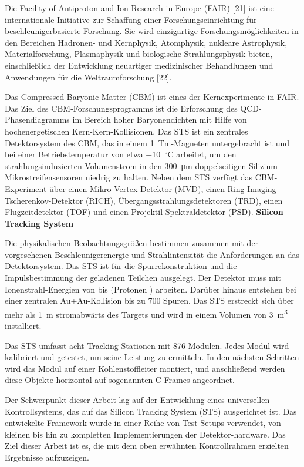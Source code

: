 Die Facility of Antiproton and Ion Research in Europe (FAIR) [21] ist eine internationale Initiative zur Schaffung einer Forschungseinrichtung für beschleunigerbasierte Forschung. Sie wird einzigartige Forschungsmöglichkeiten in den Bereichen Hadronen- und Kernphysik, Atomphysik, nukleare Astrophysik, Materialforschung, Plasmaphysik und biologische Strahlungsphysik bieten, einschließlich der Entwicklung neuartiger medizinischer Behandlungen und Anwendungen für die Weltraumforschung [22].

Das Compressed Baryonic Matter (CBM) ist eines der Kernexperimente in FAIR. Das Ziel des CBM-Forschungsprogramms ist die Erforschung des QCD-Phasendiagramms im Bereich hoher Baryonendichten mit Hilfe von hochenergetischen Kern-Kern-Kollisionen. Das \gls{STS} ist ein zentrales Detektorsystem des CBM, das in einem 1~Tm-Magneten untergebracht ist und bei einer Betriebstemperatur von etwa \SI{-10}{\celsius} arbeitet, um den strahlungsinduzierten Volumenstrom in den \SI{300}{\micro\metre} doppelseitigen Silizium-Mikrostreifensensoren niedrig zu halten. Neben dem \gls{STS} verfügt das CBM-Experiment über einen Mikro-Vertex-Detektor (MVD), einen Ring-Imaging-Tscherenkov-Detektor (RICH), Übergangsstrahlungsdetektoren (TRD), einen Flugzeitdetektor (TOF) und einen Projektil-Spektraldetektor (PSD).
\bigbreak
\textbf{Silicon Tracking System}
\bigbreak

Die physikalischen Beobachtungsgrößen bestimmen zusammen mit der vorgesehenen Beschleunigerenergie und Strahlintensität die Anforderungen an das Detektorsystem. Das \gls{STS} ist für die Spurrekonstruktion und die Impulsbestimmung der geladenen Teilchen ausgelegt. Der Detektor muss mit Ionenstrahl-Energien von  bis  (Protonen ) arbeiten. Darüber hinaus entstehen bei einer zentralen Au+Au-Kollision bis zu 700 Spuren. Das \gls{STS} erstreckt sich über mehr als \SI{1}{\meter} stromabwärts des Targets und wird in einem Volumen von \SI{3}{\cubic\meter} installiert. 

Das \gls{STS} umfasst acht Tracking-Stationen mit 876 Modulen. Jedes Modul wird kalibriert und getestet, um seine Leistung zu ermitteln. In den nächsten Schritten wird das Modul auf einer Kohlenstoffleiter montiert, und anschließend werden diese Objekte horizontal auf sogenannten C-Frames angeordnet. 

Der Schwerpunkt dieser Arbeit lag auf der Entwicklung eines universellen Kontrollsystems, das auf das Silicon Tracking System (\gls{STS}) ausgerichtet ist. Das entwickelte Framework wurde in einer Reihe von Test-Setups verwendet, von kleinen bis hin zu kompletten Implementierungen der Detektor-hardware. Das Ziel dieser Arbeit ist es, die mit dem oben erwähnten Kontrollrahmen erzielten Ergebnisse aufzuzeigen.

